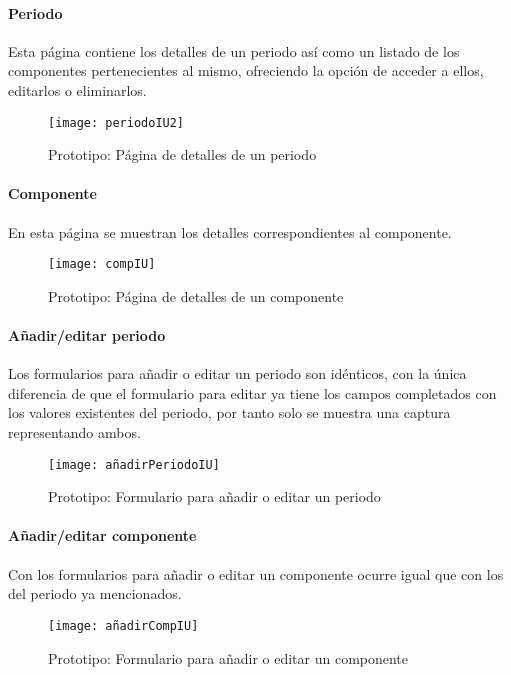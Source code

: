 \paragraph*{Periodo}
Esta página contiene los detalles de un periodo así como un listado de los componentes pertenecientes al mismo, ofreciendo la opción de acceder a ellos, editarlos o eliminarlos.
\begin{figure}[H]
\centering
\texttt{[image: periodoIU2]}
\caption{Prototipo: Página de detalles de un periodo}
\end{figure}
\paragraph*{Componente}
En esta página se muestran los detalles correspondientes al componente.
\begin{figure}[H]
\centering
\texttt{[image: compIU]}
\caption{Prototipo: Página de detalles de un componente}
\end{figure}
\paragraph*{Añadir/editar periodo}
Los formularios para añadir o editar un periodo son idénticos, con la única diferencia de que el formulario para editar ya tiene los campos completados con los valores existentes del periodo, por tanto solo se muestra una captura representando ambos.
\begin{figure}[H]
\centering
\texttt{[image: añadirPeriodoIU]}
\caption{Prototipo: Formulario para añadir o editar un periodo}
\end{figure}
\paragraph*{Añadir/editar componente}
Con los formularios para añadir o editar un componente ocurre igual que con los del periodo ya mencionados.
\begin{figure}[H]
\centering
\texttt{[image: añadirCompIU]}
\caption{Prototipo: Formulario para añadir o editar un componente}
\end{figure}




